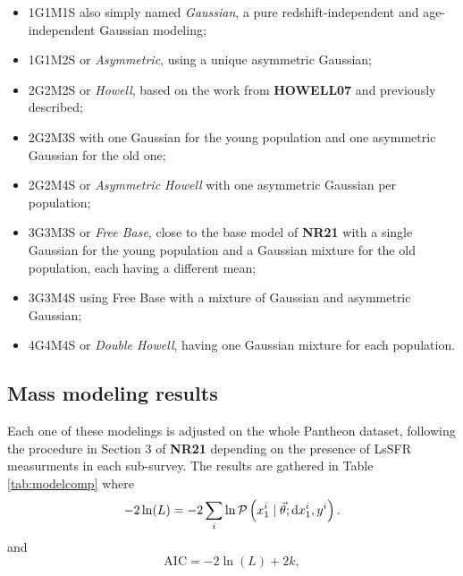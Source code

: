 \documentclass[../main/main.tex]{subfiles}
\begin{document}
\begin{itemize}
    \item 1G1M1S also simply named \textit{Gaussian}, a pure
        redshift-independent and age-independent Gaussian modeling;

    \item 1G1M2S or \textit{Asymmetric}, using a unique asymmetric Gaussian;

    \item 2G2M2S or \textit{Howell}, based on the work from \textbf{HOWELL07}
        and previously described;

    \item 2G2M3S with one Gaussian for the young population and one asymmetric
        Gaussian for the old one;

    \item 2G2M4S or \textit{Asymmetric Howell} with one asymmetric Gaussian per
        population;

    \item 3G3M3S or \textit{Free Base}, close to the base model of \textbf{NR21}
        with a single Gaussian for the young population and a Gaussian mixture
        for the old population, each having a different mean;

    \item 3G3M4S using Free Base with a mixture of Gaussian and asymmetric
        Gaussian;

    \item 4G4M4S or \textit{Double Howell}, having one Gaussian mixture for each
        population.
\end{itemize}

\subsection{Mass modeling results}

Each one of these modelings is adjusted on the whole Pantheon dataset,
following the procedure in Section 3 of \textbf{NR21} depending on the presence
of LsSFR measurments in each sub-survey. The results are gathered in Table
\ref{tab:modelcomp} where 
\begin{equation}\label{eq:likelihood}
    -2\ln(L) = -2 \sum_i \ln \mathcal{P}\left(x_1^i \mid \vec{\theta};
    \mathrm{d}x_1^i, y^i\right).
\end{equation}
and 
\begin{equation}
    \mathrm{AIC} = -2\ln(L) + 2k,
\end{equation}
\end{document}
